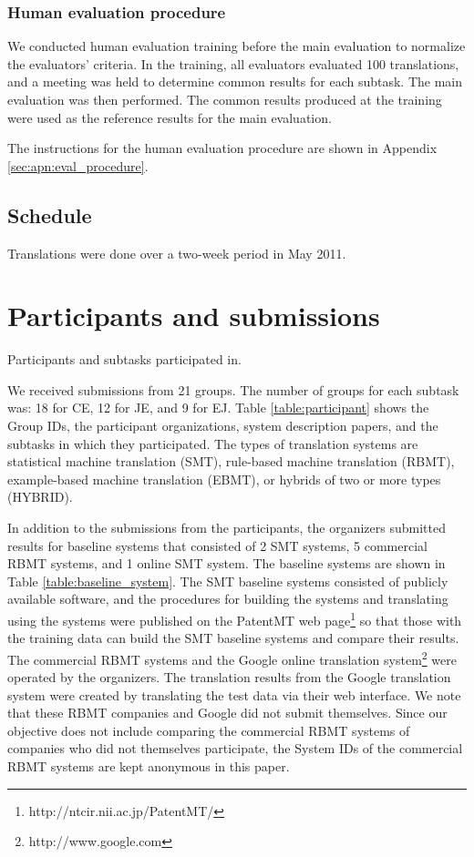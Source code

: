 \documentclass[english]{jnlp_1.4}
\begin{document}
\subsubsection{Human evaluation procedure}

We conducted human evaluation training before the main evaluation to normalize the evaluators' criteria. 
In the training, all evaluators evaluated 100 translations, and a meeting was held to determine common results for each subtask. 
The main evaluation was then performed.  
The common results produced at the training were used as the reference results for the main evaluation.

The instructions for the human evaluation procedure are shown in Appendix \ref{sec:apn:eval_procedure}.


\subsection{Schedule}

Translations were done over a two-week period in May 2011. 


\section{Participants and submissions}
\label{sec:participants_and_submissions}

\begin{table}[b]
\caption{Participants and subtasks participated in.}
\label{table:participant}

\end{table}

We received submissions from 21 groups. 
The number of groups for each subtask was: 18 for CE, 12 for JE, and 9 for EJ. 
Table \ref{table:participant} shows the Group IDs, the participant organizations, system description papers, and the subtasks in which they participated. 
The types of translation systems are statistical machine translation (SMT),  rule-based machine translation (RBMT), example-based machine translation (EBMT), or hybrids of two or more types (HYBRID).

In addition to the submissions from the participants, the organizers submitted results for baseline systems that consisted of 2 SMT systems, 5 commercial RBMT systems, and 1 online SMT system. 
The baseline systems are shown in Table \ref{table:baseline_system}. 
The SMT baseline systems consisted of publicly available software, and the procedures for building the systems and translating using the systems were published on the PatentMT web page\footnote{http://ntcir.nii.ac.jp/PatentMT/} so that those with the training data can build the SMT baseline systems and compare their results. 
The commercial RBMT systems and the Google online translation system\footnote{http://www.google.com} were operated by the organizers. 
The translation results from the Google translation system were created by translating the test data via their web interface. 
We note that these RBMT companies and Google did not submit themselves. 
Since our objective does not include comparing the commercial RBMT systems of companies who did not themselves participate, the System IDs of the commercial RBMT systems are kept anonymous in this paper. 
\end{document}
